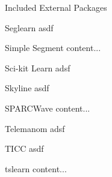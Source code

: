 \documentclass[10pt,a4paper]{report}
\begin{document}
\begin{chapter}{Included External Packages}
\begin{section}{Seglearn}
	asdf
\end{section}


\begin{section}{Simple Segment}
	content...
\end{section}

\begin{section}{Sci-kit Learn}
	adsf	
\end{section}

\begin{section}{Skyline}
	asdf
\end{section}


\begin{section}{SPARCWave}
	content...
\end{section}

\begin{section}{Telemanom}
	adsf	
\end{section}

\begin{section}{TICC}
	asdf
\end{section}

\begin{section}{tslearn}
	content...
\end{section}



\end{chapter}
	
	
\end{document}
